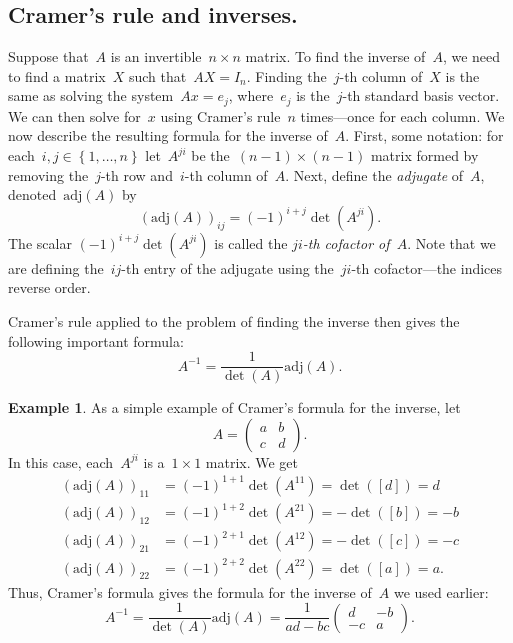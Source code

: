 \documentclass[11pt,twoside]{amsart}
\theoremstyle{plain}
\theoremstyle{remark}
\theoremstyle{definition}
\newtheorem{ex}[prop]{Example}
\theoremstyle{definition}
\begin{document}
\subsection*{Cramer's rule and inverses.}  Suppose that~$A$ is an invertible~$n\times n$
matrix.  To find the inverse of~$A$, we need to find a matrix~$X$ such
that~$AX=I_n$. Finding the~$j$-th column of~$X$ is the same as solving the
system~$Ax=e_j$, where~$e_j$ is the~$j$-th standard basis vector. We can then
solve for~$x$ using Cramer's rule~$n$ times---once for each column.  We now
describe the resulting formula for the inverse of~$A$.  First, some notation:
for each~$i,j\in\left\{ 1,\dots,n \right\}$ let~$A^{ji}$ be
the~$(n-1)\times(n-1)$ matrix formed by removing the~$j$-th row and~$i$-th
column of~$A$.  Next, define the {\em adjugate} of~$A$,
denoted~$\mathrm{adj}(A)$ by
\[
  (\mathrm{adj}(A))_{ij}=(-1)^{i+j}\det(A^{ji}).
\]
The scalar $(-1)^{i+j}\det(A^{ji})$ is called the {\em $ji$-th cofactor
of~$A$}.  Note that we are defining the~$ij$-th entry of the adjugate using
the~$ji$-th cofactor---the indices reverse order.

Cramer's rule applied to the problem of finding the inverse then gives the
following important formula:
\[
  A^{-1}=\frac{1}{\det(A)}\mathrm{adj}(A).
\]

\begin{ex}
As a simple example of Cramer's formula for the inverse, let
\[
A=
\left(\begin{array}{cc}
    a&b\\
    c&d
\end{array} \right).
\]
In this case, each~$A^{ji}$ is a~$1\times 1$ matrix. We get
\begin{align*}
  (\mathrm{adj}(A))_{11}&=(-1)^{1+1}\det(A^{11})=\det([d])=d\\
  (\mathrm{adj}(A))_{12}&=(-1)^{1+2}\det(A^{21})=-\det([b])=-b\\
  (\mathrm{adj}(A))_{21}&=(-1)^{2+1}\det(A^{12})=-\det([c])=-c\\
  (\mathrm{adj}(A))_{22}&=(-1)^{2+2}\det(A^{22})=\det([a])=a.
\end{align*}
Thus, Cramer's formula gives the formula for the inverse of~$A$ we used earlier:
\[
  A^{-1}=\frac{1}{\det(A)}\mathrm{adj}(A)
  =\frac{1}{ad-bc}\left(\begin{array}{rr}
      d&-b\\
      -c&a
  \end{array} \right).
\]
\end{ex}
\end{document}
